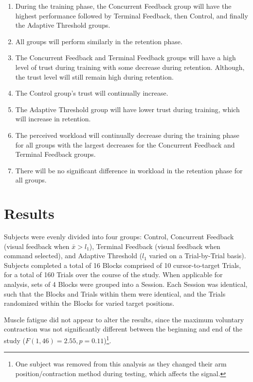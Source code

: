 \begin{enumerate}
	\item During the training phase, the Concurrent Feedback group will have the highest performance followed by Terminal Feedback, then Control, and finally the Adaptive Threshold groups.
	\item All groups will perform similarly in the retention phase.
	\item The Concurrent Feedback and Terminal Feedback groups will have a high level of trust during training with some decrease during retention.
	      Although, the trust level will still remain high during retention.
	\item The Control group's trust will continually increase.
	\item The Adaptive Threshold group will have lower trust during training, which will increase in retention.
	\item The perceived workload will continually decrease during the training phase for all groups with the largest decreases for the Concurrent Feedback and Terminal Feedback groups.
	\item There will be no significant difference in workload in the retention phase for all groups.
\end{enumerate}

\section{Results}

\begin{mdframed}[hidealllines=true,backgroundcolor=blue!20]
	Subjects were evenly divided into four groups: Control, Concurrent Feedback (visual feedback when $\bar{x}> l_1$), Terminal Feedback (visual feedback when command selected), and Adaptive Threshold ($l_1$ varied on a Trial-by-Trial basis).
	Subjects completed a total of 16 Blocks comprised of 10 cursor-to-target Trials, for a total of 160 Trials over the course of the study.
	When applicable for analysis, sets of 4 Blocks were grouped into a Session.
	Each Session was identical, such that the Blocks and Trials within them were identical, and the Trials randomized within the Blocks for varied target positions.
\end{mdframed}
Muscle fatigue did not appear to alter the results, since the maximum voluntary contraction was not significantly different between the beginning and end of the study ($F(1, 46) = 2.55, p = 0.11$)\footnote{One subject was removed from this analysis as they changed their arm position/contraction method during testing, which affects the signal.}.

